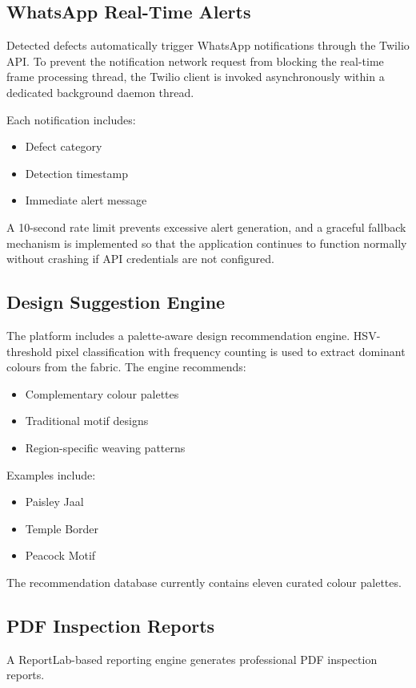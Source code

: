\documentclass{ieeeaccess}
\begin{document}
\subsection{WhatsApp Real-Time Alerts}
Detected defects automatically trigger WhatsApp notifications through the Twilio API. To prevent the notification network request from blocking the real-time frame processing thread, the Twilio client is invoked asynchronously within a dedicated background daemon thread.

Each notification includes:
\begin{itemize}
    \item Defect category
    \item Detection timestamp
    \item Immediate alert message
\end{itemize}
A 10-second rate limit prevents excessive alert generation, and a graceful fallback mechanism is implemented so that the application continues to function normally without crashing if API credentials are not configured.

\subsection{Design Suggestion Engine}
The platform includes a palette-aware design recommendation engine. HSV-threshold pixel classification with frequency counting is used to extract dominant colours from the fabric. The engine recommends:
\begin{itemize}
    \item Complementary colour palettes
    \item Traditional motif designs
    \item Region-specific weaving patterns
\end{itemize}
Examples include:
\begin{itemize}
    \item Paisley Jaal
    \item Temple Border
    \item Peacock Motif
\end{itemize}
The recommendation database currently contains eleven curated colour palettes.

\subsection{PDF Inspection Reports}
A ReportLab-based reporting engine generates professional PDF inspection reports.
\end{document}
